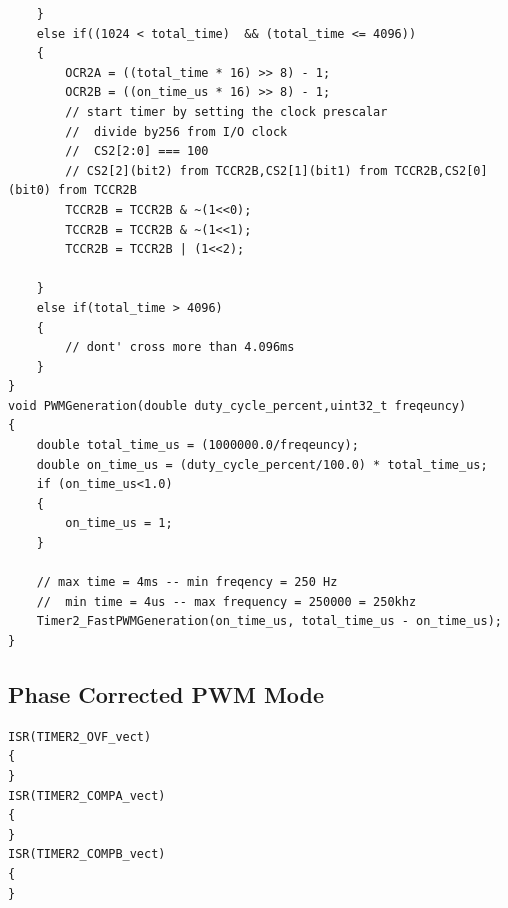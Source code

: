 \documentclass{article}
\begin{document}
\begin{verbatim}
	}
	else if((1024 < total_time)  && (total_time <= 4096))
	{
		OCR2A = ((total_time * 16) >> 8) - 1;
		OCR2B = ((on_time_us * 16) >> 8) - 1;
		// start timer by setting the clock prescalar
		//  divide by256 from I/O clock
		//  CS2[2:0] === 100
		// CS2[2](bit2) from TCCR2B,CS2[1](bit1) from TCCR2B,CS2[0](bit0) from TCCR2B
		TCCR2B = TCCR2B & ~(1<<0);
		TCCR2B = TCCR2B & ~(1<<1);
		TCCR2B = TCCR2B | (1<<2);
		
	}
	else if(total_time > 4096)
	{
		// dont' cross more than 4.096ms
	}
}
void PWMGeneration(double duty_cycle_percent,uint32_t freqeuncy)
{
	double total_time_us = (1000000.0/freqeuncy);	
	double on_time_us = (duty_cycle_percent/100.0) * total_time_us;
	if (on_time_us<1.0)
	{
		on_time_us = 1;
	}
	
	// max time = 4ms -- min freqency = 250 Hz
	//  min time = 4us -- max frequency = 250000 = 250khz
	Timer2_FastPWMGeneration(on_time_us, total_time_us - on_time_us);
}
\end{verbatim}


\subsection{Phase Corrected PWM Mode}
\begin{verbatim}
ISR(TIMER2_OVF_vect)
{
} 
ISR(TIMER2_COMPA_vect)
{
}
ISR(TIMER2_COMPB_vect)
{
}
\end{verbatim}
\end{document}
